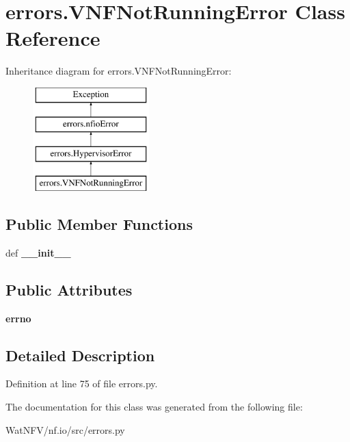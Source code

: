 \hypertarget{classerrors_1_1VNFNotRunningError}{\section{errors.\-V\-N\-F\-Not\-Running\-Error Class Reference}
\label{classerrors_1_1VNFNotRunningError}
}
Inheritance diagram for errors.\-V\-N\-F\-Not\-Running\-Error\-:\begin{figure}[H]
\begin{center}
\leavevmode
\includegraphics[height=4.000000cm]{classerrors_1_1VNFNotRunningError}
\end{center}
\end{figure}
\subsection*{Public Member Functions}
\begin{DoxyCompactItemize}
\item 
\hypertarget{classerrors_1_1VNFNotRunningError_a9f548d7d752d002aad923fa0d39a9e12}{def {\bfseries \-\_\-\-\_\-init\-\_\-\-\_\-}}\label{classerrors_1_1VNFNotRunningError_a9f548d7d752d002aad923fa0d39a9e12}

\end{DoxyCompactItemize}
\subsection*{Public Attributes}
\begin{DoxyCompactItemize}
\item 
\hypertarget{classerrors_1_1VNFNotRunningError_a0851579bdfdaf110fa92e6d2df503827}{{\bfseries errno}}\label{classerrors_1_1VNFNotRunningError_a0851579bdfdaf110fa92e6d2df503827}

\end{DoxyCompactItemize}


\subsection{Detailed Description}


Definition at line 75 of file errors.\-py.



The documentation for this class was generated from the following file\-:\begin{DoxyCompactItemize}
\item 
Wat\-N\-F\-V/nf.\-io/src/errors.\-py\end{DoxyCompactItemize}
